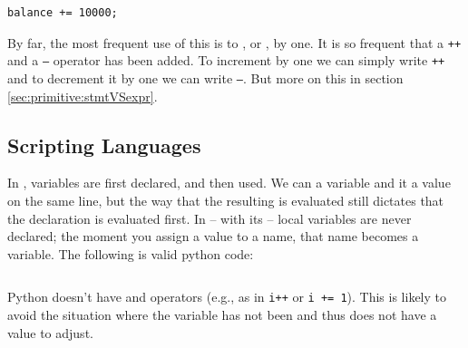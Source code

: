 \begin{verbatim}
balance += 10000;
\end{verbatim}

By far, the most frequent use of this is to , or , by one. It is so frequent that a \texttt{++} and a \texttt{--} operator has been added. To increment  by one we can simply write \texttt{++} and to decrement it by one we can write \texttt{--}. But more on this in section \ref{sec:primitive:stmtVSexpr}.

\subsection{Scripting Languages}

In \csharp, variables are first declared, and then used. We can  a variable and  it a value on the same line, but the way that the resulting  is evaluated still dictates that the declaration is evaluated first. In  -- with its  -- local variables are never declared; the moment you assign a value to a name, that name becomes a variable. The following is valid python code:

\inputminted[firstline=3]{python}{../src/python/primitives/nodecl/nodecl.py}

Python doesn't have  and  operators (e.g., as in \texttt{i++} or \texttt{i += 1}). This is likely to avoid the situation where the variable has not been  and thus does not have a value to adjust.

